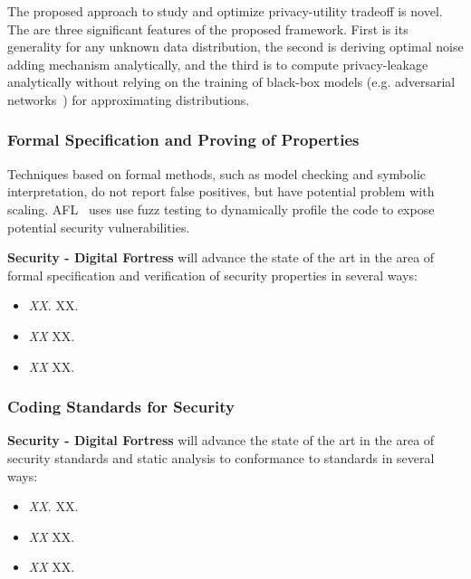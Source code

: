 \documentclass[a4paper,11pt]{article}
\newcommand{\project}[1]{\textbf{#1}\xspace}
\newcommand{\SECURITY}{\project{Security - Digital Fortress}}
\newcommand{\TheProject}{\SECURITY}
\begin{document}
The proposed approach to study and optimize privacy-utility tradeoff is novel. The are three significant features of the proposed framework. First is its generality for any unknown data distribution, the second is deriving optimal noise adding mechanism analytically, and the third is to compute privacy-leakage analytically without relying on the training of black-box models (e.g. adversarial networks~\cite{8919758}) for approximating distributions. 




\subsubsection{Formal Specification and Proving of Properties}
\label{sect:formal}


Techniques based on formal methods, such as model checking and symbolic interpretation, do not report false  positives, but have potential problem with scaling. AFL~\cite{AFL} uses use fuzz testing to dynamically profile the code to expose potential security vulnerabilities.

\begin{mdframed}[backgroundcolor=gray!10]
\TheProject{} will advance the state of the art in the area of formal specification and verification of security properties in several ways:
\begin{itemize}
\item \emph{XX.} XX.
\item \emph{XX} XX.
\item \emph{XX} XX.
\end{itemize}
\end{mdframed}

\subsubsection{Coding Standards for Security}
\label{sect:codingStandards}

\begin{mdframed}[backgroundcolor=gray!10]
\TheProject{} will advance the state of the art in the area of security standards and static analysis to conformance to standards in several ways:
\begin{itemize}
\item \emph{XX.} XX.
\item \emph{XX} XX.
\item \emph{XX} XX.
\end{itemize}
\end{mdframed}
\end{document}
